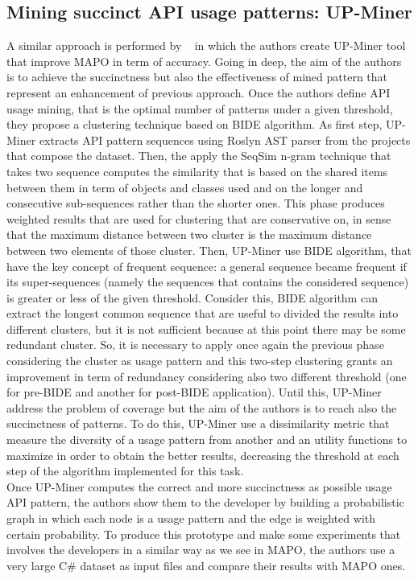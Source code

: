 \subsection{Mining succinct API usage patterns: UP-Miner}
A similar approach is performed by ~\cite{wang_mining_2013} in which the authors create UP-Miner tool that improve MAPO in term of accuracy. Going in deep, the aim of the authors is to achieve the succinctness but also the effectiveness of mined pattern that represent an enhancement of previous approach. Once the authors define API usage mining, that is the optimal number of patterns under a given threshold, they propose a clustering technique based on BIDE algorithm. As first step, UP-Miner extracts API pattern sequences using Roslyn AST parser from the projects that compose the dataset. Then, the apply the SeqSim n-gram technique that takes two sequence computes the similarity that is based on the shared items between them in term of objects and classes used and on the longer and consecutive sub-sequences rather than the shorter ones. This phase produces weighted results that are used for clustering that are conservative on, in sense that the maximum distance between two cluster is the maximum distance between two elements of those cluster.\newline
Then, UP-Miner use BIDE algorithm, that have the key concept of frequent sequence: a general sequence became frequent if its super-sequences (namely the sequences that contains the considered sequence) is greater or less of the given threshold. Consider this, BIDE algorithm can extract the longest common sequence that are useful to divided the results into different clusters, but it is not sufficient because at this point there may be some redundant cluster. So, it is necessary to apply once again the previous phase considering the cluster as usage pattern and this two-step clustering grants an improvement in term of redundancy considering also two different threshold (one for pre-BIDE and another for post-BIDE application). Until this, UP-Miner address the problem of coverage but the aim of the authors is to reach also the succinctness of patterns. To do this, UP-Miner use a dissimilarity metric that measure the diversity of a usage pattern from another and an utility functions to maximize in order to obtain the better results, decreasing the threshold at each step of the algorithm implemented for this task. \\
Once UP-Miner computes the correct and more succinctness as possible usage API pattern, the authors show them to the developer by building a probabilistic graph in which each node is a usage pattern and the edge is weighted with certain probability. To produce this prototype and make some experiments that involves the developers in a similar way as we see in MAPO, the authors use a very large C\# dataset as input files and compare their results with MAPO ones.

